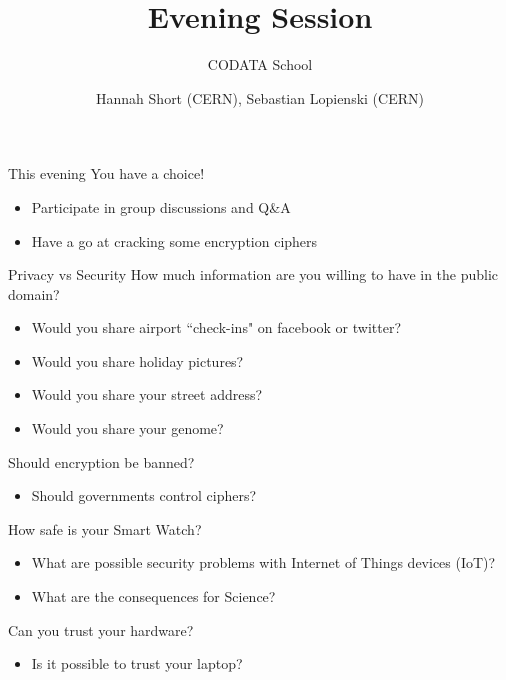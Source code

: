 \documentclass{beamer}
\author{Hannah Short (CERN), Sebastian Lopienski (CERN)}
\title{Evening Session}
\subtitle{CODATA School}
\begin{document}
\frontcover

\frame{\titlepage}


\begin{frame}{This evening}
You have a choice!
\begin{itemize}
\item Participate in group discussions and Q\&A
\item Have a go at cracking some encryption ciphers
\end{itemize}
\end{frame}

\begin{frame}{Privacy vs Security}
How much information are you willing to have in the public domain?
\begin{itemize}
\item Would you share airport ``check-ins" on facebook or twitter?
\item Would you share holiday pictures?
\item Would you share your street address?
\item Would you share your genome?
\end{itemize}
\end{frame}

\begin{frame}{Should encryption be banned?}
\begin{itemize}
\item Should governments control ciphers?
\end{itemize}
\end{frame}

\begin{frame}{How safe is your Smart Watch?}
\begin{itemize}
\item What are possible security problems with Internet of Things devices (IoT)?
\item What are the consequences for Science?
\end{itemize} 
\end{frame}

\begin{frame}{Can you trust your hardware?}
\begin{itemize}
\item Is it possible to trust your laptop?
\end{itemize}
\end{frame}
\end{document}
